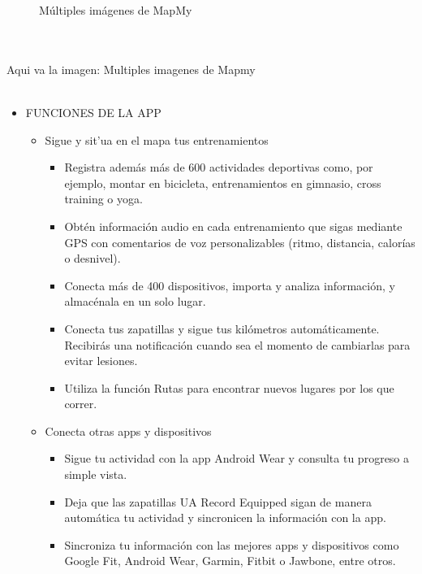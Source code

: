 \documentclass[a4paper, 11pt]{article}
\begin{document}
\begin{itemize}
\begin{figure}[h]
                            \caption{Múltiples imágenes de MapMy}
                            \label{f:mapmy}
                        \end{figure}
                        \\\\\textcolor[rgb]{1,0,0}{Aqui va la imagen: Multiples imagenes de Mapmy}\\\\
                          \begin{itemize}
                            \item{FUNCIONES DE LA APP}
                            \begin{itemize}
                              \item {Sigue y sit'ua en el mapa tus entrenamientos}
                              \begin{itemize}
                                \item {Registra además más de 600 actividades deportivas como, por ejemplo, montar en bicicleta, entrenamientos en gimnasio, cross training o yoga.}
                                \item {Obtén información audio en cada entrenamiento que sigas mediante GPS con comentarios de voz personalizables (ritmo, distancia, calorías o desnivel).}
                                \item {Conecta más de 400 dispositivos, importa y analiza información, y almacénala en un solo lugar.}
                                \item {Conecta tus zapatillas y sigue tus kilómetros automáticamente. Recibirás una notificación cuando sea el momento de cambiarlas para evitar lesiones.}
                                \item {Utiliza la función Rutas para encontrar nuevos lugares por los que correr.}
                              \end{itemize}
                              \item {Conecta otras apps y dispositivos}
                              \begin{itemize}
                                \item {Sigue tu actividad con la app Android Wear y consulta tu progreso a simple vista.}
                                \item {Deja que las zapatillas UA Record Equipped sigan de manera automática tu actividad y sincronicen la información con la app.}
                                \item {Sincroniza tu información con las mejores apps y dispositivos como Google Fit, Android Wear, Garmin, Fitbit o Jawbone, entre otros.}

\end{itemize}
\end{itemize}
\end{itemize}
\end{itemize}
\end{document}
